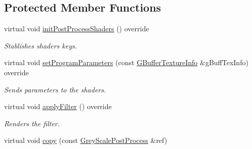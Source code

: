 \subsection*{Protected Member Functions}
\begin{DoxyCompactItemize}
\item 
\mbox{\label{class_geometry_engine_1_1_geometry_post_process_1_1_single_pass_post_process_1_1_grey_scale_post_process_a17e5445c69b1e2f975603ba84d9b03b6}} 
virtual void \mbox{\hyperlink{class_geometry_engine_1_1_geometry_post_process_1_1_single_pass_post_process_1_1_grey_scale_post_process_a17e5445c69b1e2f975603ba84d9b03b6}{init\+Post\+Process\+Shaders}} () override
\begin{DoxyCompactList}\small\item\em Stablishes shaders keys. \end{DoxyCompactList}\item 
\mbox{\label{class_geometry_engine_1_1_geometry_post_process_1_1_single_pass_post_process_1_1_grey_scale_post_process_ab60a2926e4d28cb0b808a3e01bbe85d3}} 
virtual void \mbox{\hyperlink{class_geometry_engine_1_1_geometry_post_process_1_1_single_pass_post_process_1_1_grey_scale_post_process_ab60a2926e4d28cb0b808a3e01bbe85d3}{set\+Program\+Parameters}} (const \mbox{\hyperlink{class_geometry_engine_1_1_g_buffer_texture_info}{G\+Buffer\+Texture\+Info}} \&g\+Buff\+Tex\+Info) override
\begin{DoxyCompactList}\small\item\em Sends parameters to the shaders. \end{DoxyCompactList}\item 
\mbox{\label{class_geometry_engine_1_1_geometry_post_process_1_1_single_pass_post_process_1_1_grey_scale_post_process_abfa5e2162bb4300ec4fea1b36873d786}} 
virtual void \mbox{\hyperlink{class_geometry_engine_1_1_geometry_post_process_1_1_single_pass_post_process_1_1_grey_scale_post_process_abfa5e2162bb4300ec4fea1b36873d786}{apply\+Filter}} () override
\begin{DoxyCompactList}\small\item\em Renders the filter. \end{DoxyCompactList}\item 
virtual void \mbox{\hyperlink{class_geometry_engine_1_1_geometry_post_process_1_1_single_pass_post_process_1_1_grey_scale_post_process_ae22e2bf8dc5b553a7b1526b695c8be88}{copy}} (const \mbox{\hyperlink{class_geometry_engine_1_1_geometry_post_process_1_1_single_pass_post_process_1_1_grey_scale_post_process}{Grey\+Scale\+Post\+Process}} \&ref)
\end{DoxyCompactItemize}
